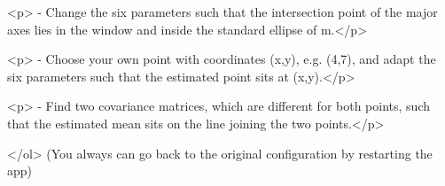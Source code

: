 			<p>  - Change the six parameters such that the intersection point of the major axes lies in the window and inside the standard ellipse of m.</p>
 			
 			<p>  - Choose your own point with coordinates (x,y), e.g. (4,7), and adapt the six parameters such that the estimated point sits at (x,y).</p>
					
 			<p>  - Find two covariance matrices, which are different for both points, such that the estimated mean sits on the line joining the two points.</p>
 			
	    
	        </ol>
					(You always can go back to the original configuration by restarting the app)